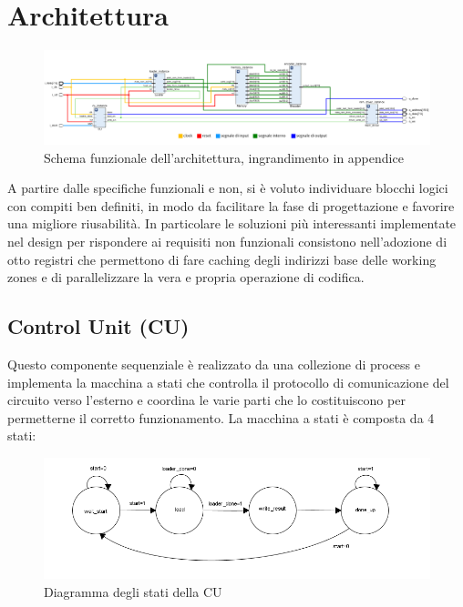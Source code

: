 \documentclass[10pt,english, openany]{book}
\begin{document}
\chapter{Architettura}

\begin{figure}[h!]
    \centering
    \includegraphics[scale=0.26]{schematics.png}
    \caption{Schema funzionale dell'architettura, ingrandimento in 					appendice}
    \label{fig:schematic}
\end{figure}{}



A partire dalle specifiche funzionali e non, si è voluto individuare blocchi logici con compiti ben definiti, in modo da facilitare la fase di progettazione e favorire una migliore riusabilità. In particolare le soluzioni più interessanti implementate nel design per rispondere ai requisiti non funzionali consistono nell’adozione di otto registri che permettono di fare caching degli indirizzi base delle working zones e di parallelizzare la vera e propria operazione di codifica.

\section{Control Unit (CU)}

Questo componente sequenziale è realizzato da una collezione di process e implementa la macchina a stati che controlla il protocollo di comunicazione del circuito verso l’esterno e coordina le varie parti che lo costituiscono per permetterne il corretto funzionamento. La macchina a stati è composta da 4 stati:

\begin{figure}[h!] %
    \centering
    \includegraphics[scale=0.75]{stati_cu.png}
    \caption{Diagramma degli stati della CU}
    \label{fig:stati_cu}
\end{figure}{}
\end{document}
